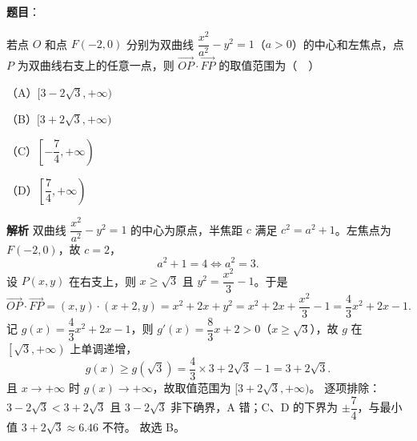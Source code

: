 \begin{answer}

\textbf{题目}：

若点 $O$ 和点 $F(-2,0)$ 分别为双曲线 $\dfrac{x^2}{a^2}-y^2=1$（$a>0$）的中心和左焦点，点 $P$ 为双曲线右支上的任意一点，则 $\overrightarrow{OP}\cdot\overrightarrow{FP}$ 的取值范围为（　）

（A）$[3-2\sqrt3,+\infty)$

（B）$[3+2\sqrt3,+\infty)$

（C）$\left[-\dfrac74,+\infty\right)$

（D）$\left[\dfrac74,+\infty\right)$

\textbf{解析}
双曲线 $\dfrac{x^2}{a^2}-y^2=1$ 的中心为原点，半焦距 $c$ 满足 $c^2=a^2+1$。左焦点为 $F(-2,0)$，故 $c=2$，
\nopagebreak[4]
\[a^2+1=4\iff a^2=3.\]
设 $P(x,y)$ 在右支上，则 $x\geqslant\sqrt3$ 且 $y^2=\dfrac{x^2}{3}-1$。于是
\nopagebreak[4]
\[\overrightarrow{OP}\cdot\overrightarrow{FP}=(x,y)\cdot(x+2,y)=x^2+2x+y^2
=x^2+2x+\frac{x^2}{3}-1=\frac43x^2+2x-1.\]
记 $g(x)=\dfrac43x^2+2x-1$，则 $g'(x)=\dfrac83x+2>0$（$x\geqslant\sqrt3$），故 $g$ 在 $\left[\sqrt3,+\infty\right)$ 上单调递增，
\nopagebreak[4]
\[g(x)\geqslant g(\sqrt3)=\frac43\times3+2\sqrt3-1=3+2\sqrt3.\]
且 $x\to+\infty$ 时 $g(x)\to+\infty$，故取值范围为 $[3+2\sqrt3,+\infty)$。
逐项排除：$3-2\sqrt3<3+2\sqrt3$ 且 $3-2\sqrt3$ 非下确界，A 错；C、D 的下界为 $\pm\dfrac74$，与最小值 $3+2\sqrt3\approx6.46$ 不符。
故选 B。


\end{answer}
